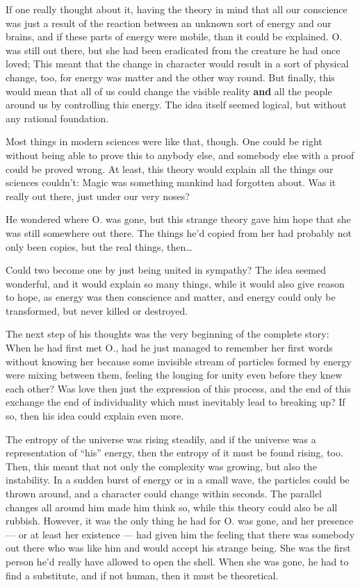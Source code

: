 If one really thought about it, having the theory in mind that all our conscience was just a result of the reaction between an unknown sort of energy and our brains, and if these parts of energy were mobile, than it could be explained. O. was still out there, but she had been eradicated from the creature he had once loved; This meant that the change in character would result in a sort of physical change, too, for energy was matter and the other way round. But finally, this would mean that all of us could change the visible reality \textbf{and} all the people around us by controlling this energy. The idea itself seemed logical, but without any rational foundation.

Most things in modern sciences were like that, though. One could be right without being able to prove this to anybody else, and somebody else with a proof could be proved wrong. 
At least, this theory would explain all the things our sciences couldn't: Magic was something mankind had forgotten about. Was it really out there, just under our very noses?

He wondered where O. was gone, but this strange theory gave him hope that she was still somewhere out there. The things he'd copied from her had probably not only been copies, but the real things, then\dots{}

Could two become one by just being united in sympathy? The idea seemed wonderful, and it would explain so many things, while it would also give reason to hope, as energy was then conscience and matter, and energy could only be transformed, but never killed or destroyed.

The next step of his thoughts was the very beginning of the complete story: When he had first met O., had he just managed to remember her first words without knowing her because some invisible stream of particles formed by energy were mixing between them, feeling the longing for unity even before they knew each other? Was love then just the expression of this process, and the end of this exchange the end of individuality which must inevitably lead to breaking up? If so, then his idea could explain even more.

The entropy of the universe was rising steadily, and if the universe was a representation of \enquote{his} energy, then the entropy of it must be found rising, too. Then, this meant that not only the complexity was growing, but also the instability. In a sudden burst of energy or in a small wave, the particles could be thrown around, and a character could change within seconds. The parallel changes all around him made him think so, while this theory could also be all rubbish. However, it was the only thing he had for O. was gone, and her presence --- or at least her existence --- had given him the feeling that there was somebody out there who was like him and would accept his strange being. She was the first person he'd really have allowed to open the shell. When she was gone, he had to find a substitute, and if not human, then it must be theoretical.

